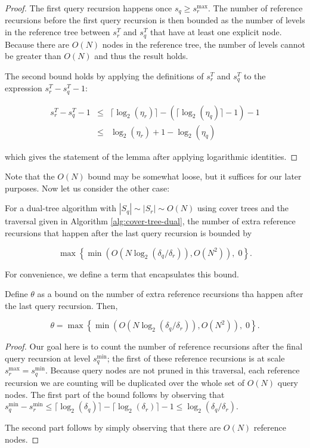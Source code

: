 \begin{proof}
The first query recursion happens once $s_q \ge s_r^{\max}$.  The number of
reference recursions before the first query recursion is then bounded as the
number of levels in the reference tree between $s_r^T$ and $s_q^T$ that have at
least one explicit node.  Because there are $O(N)$ nodes in the reference tree,
the number of levels cannot be greater than $O(N)$ and thus the result holds.

The second bound holds by applying the definitions of $s_r^T$ and $s_q^T$ to the
expression $s_r^T - s_q^T - 1$:

\begin{eqnarray}
s_r^T - s_q^T - 1 &\le& \lceil \log_2(\eta_r) \rceil - (\lceil \log_2(\eta_q)
\rceil - 1) - 1 \\
&\le& \log_2(\eta_r) + 1 - \log_2(\eta_q)
\end{eqnarray}

\noindent which gives the statement of the lemma after applying logarithmic
identities.
\end{proof}

Note that the $O(N)$ bound may be somewhat loose, but it suffices for our later
purposes.  Now let us consider the other case:

\begin{lemma}
\label{lem:extcase3}
For a dual-tree algorithm with $|S_q| \sim |S_r| \sim O(N)$ using cover trees and
the traversal given in Algorithm \ref{alg:cover-tree-dual}, the number of extra
reference recursions that happen after the last query recursion is bounded by

\begin{equation}
\max\left\{\min\left(O(N \log_2(\delta_q / \delta_r)),
O(N^2)\right), \; 0\right\}.
\end{equation}
\end{lemma}

For convenience, we define a term that encapsulates this bound.

\begin{defn}
Define $\theta$ as a bound on the number of extra reference recursions tha
happen after the last query recursion.  Then,

\begin{equation}
\theta = \max\left\{\min\left(O(N \log_2(\delta_q / \delta_r)), O(N^2)\right),
\; 0\right\}.
\end{equation}
\end{defn}

\begin{proof}
Our goal here is to count the number of reference recursions after the final
query recursion at level $s_q^{\min}$; the first of these reference recursions
is at scale $s_r^{\max} = s_q^{\min}$.  Because query nodes are not pruned in
this traversal, each reference recursion we are counting will be duplicated over
the whole set of $O(N)$ query nodes.  The first part of the bound follows by
observing that
$s_q^{\min} - s_r^{\min} \le \lceil \log_2(\delta_q) \rceil -
\lceil \log_2(\delta_r) \rceil - 1 \le \log_2(\delta_q / \delta_r)$.

The second part follows by simply observing that there are $O(N)$ reference
nodes.
\end{proof}


